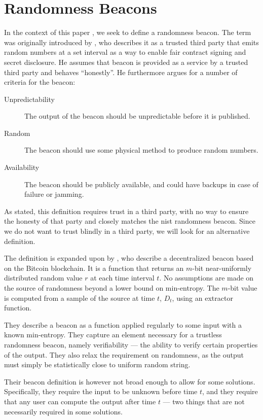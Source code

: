 \section{Randomness Beacons}\label{sec:beacons}

In the context of this paper , we seek to define a randomness beacon.
The term was originally introduced by \citet{rabin1983transaction}, who describes it as a trusted third party that emits random numbers at a set interval as a way to enable fair contract signing and secret disclosure.
He assumes that beacon is provided as a service by a trusted third party and behaves \enquote{honestly}. He furthermore argues for a number of criteria for the beacon:

\begin{description}
    \item[Unpredictability] The output of the beacon should be unpredictable before it is published.
    \item[Random] The beacon should use some physical method to produce random numbers.
    \item[Availability] The beacon should be publicly available, and could have backups in case of failure or jamming.
\end{description}

As stated, this definition requires trust in a third party, with no way to ensure the honesty of that party and closely matches the \gls{nist} randomness beacon.
Since we do not want to trust blindly in a third party, we will look for an alternative definition.

The definition is expanded upon by \citet{bonneau2015bitcoin}, who describe a decentralized beacon based on the Bitcoin blockchain.
It is a function that returns an $m$-bit near-uniformly distributed random value $r$ at each time interval $t$.
No assumptions are made on the source of randomness beyond a lower bound on min-entropy.
The $m$-bit value is computed from a sample of the source at time $t$, $D_t$, using an extractor function.

They describe a beacon as a function applied regularly to some input with a known min-entropy. They capture an element necessary for a trustless randomness beacon, namely verifiability --- the ability to verify certain properties of the output.
They also relax the requirement on randomness, as the output must simply be statistically close to uniform random string.

Their beacon definition is however not broad enough to allow for some solutions. Specifically, they require the input to be unknown before time $t$, and they require that any user can compute the output after time $t$ --- two things that are not necessarily required in some solutions.

